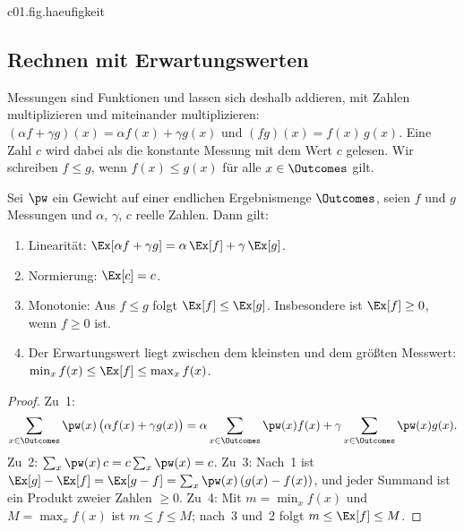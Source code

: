 \begin{tpcfigure}{c01.fig.haeufigkeit}
  \caption{Eine Messreihe mit dem gezinkten Würfel aus Gleichung~\eqref{c01.eq.gezinkt},
    erzeugt von einem Rechenprogramm mit festem Startwert. Schraffierte Balken: relative
    Häufigkeiten $h_N(x)$ nach den ersten (a) $12$, (b) $120$ und (c) $1200$ Würfen
    derselben Reihe. Dicke Querstriche: die Gewichte $\pw(x)$. In (a) liegen die Balken
    weit von den Strichen, in (c) nah an ihnen. Die Balken eines Bildes haben zusammen
    stets die Höhe $1$, wie in Gleichung~\eqref{c01.eq.haeufigkeit}.}
\end{tpcfigure}

\subsection{Rechnen mit Erwartungswerten}\label{c01.s2.2}

Messungen sind Funktionen und lassen sich deshalb addieren, mit Zahlen multiplizieren und
miteinander multiplizieren: $(\alpha f + \gamma g)(x) = \alpha f(x) + \gamma g(x)$ und
$(fg)(x) = f(x)\,g(x)$. Eine Zahl $c$ wird dabei als die konstante Messung mit dem Wert $c$
gelesen. Wir schreiben $f \leq g$, wenn $f(x) \leq g(x)$ für alle $x \in \Outcomes$ gilt.

\begin{proposition}\label{c01.prop.erwartung}
  Sei $\pw$ ein Gewicht auf einer endlichen Ergebnismenge $\Outcomes$, seien $f$ und $g$
  Messungen und $\alpha$, $\gamma$, $c$ reelle Zahlen. Dann gilt:
  \begin{enumerate}
    \item Linearität: $\Ex[\alpha f + \gamma g] = \alpha\, \Ex[f] + \gamma\, \Ex[g]$.
    \item Normierung: $\Ex[c] = c$.
    \item Monotonie: Aus $f \leq g$ folgt $\Ex[f] \leq \Ex[g]$. Insbesondere ist
      $\Ex[f] \geq 0$, wenn $f \geq 0$ ist.
    \item Der Erwartungswert liegt zwischen dem kleinsten und dem größten Messwert:
      $\min_x f(x) \leq \Ex[f] \leq \max_x f(x)$.
  \end{enumerate}
\end{proposition}
\begin{proof}
  Zu~1:
  \begin{equation}\label{c01.eq.linear}
    \sum_{x \in \Outcomes} \pw(x)\,\bigl(\alpha f(x) + \gamma g(x)\bigr)
    = \alpha \sum_{x \in \Outcomes} \pw(x) f(x) + \gamma \sum_{x \in \Outcomes} \pw(x) g(x) .
  \end{equation}
  Zu~2: $\sum_x \pw(x)\, c = c \sum_x \pw(x) = c$. Zu~3: Nach~1 ist
  $\Ex[g] - \Ex[f] = \Ex[g - f] = \sum_x \pw(x)\,(g(x) - f(x))$, und jeder Summand ist ein
  Produkt zweier Zahlen $\geq 0$. Zu~4: Mit $m = \min_x f(x)$ und $M = \max_x f(x)$ ist
  $m \leq f \leq M$; nach~3 und~2 folgt $m \leq \Ex[f] \leq M$.
\end{proof}

